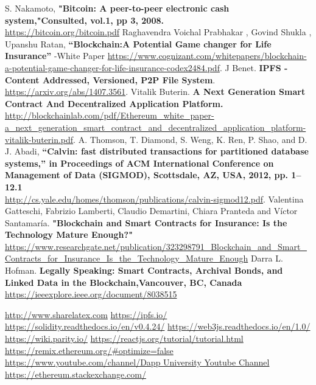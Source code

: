 \clearpage
{}
\renewcommand\bibname{Reference}
\begin{thebibliography}{99}
	\bibitem{}S. Nakamoto, \textbf{"Bitcoin: A peer-to-peer electronic cash system,"Consulted, vol.1, pp 3, 2008.}\\
	\url{https://bitcoin.org/bitcoin.pdf}
	\bibitem{}Raghavendra Voichal Prabhakar , Govind Shukla , Upanshu Ratan, \textbf{“Blockchain:A Potential Game changer for Life Insurance” }-White Paper
	\url{https://www.cognizant.com/whitepapers/blockchain-a-potential-game-changer-for-life-insurance-codex2484.pdf}.
	\bibitem{}J Benet. \textbf{IPFS - Content Addressed, Versioned, P2P File System}.\\
	\url{ https://arxiv.org/abs/1407.3561}.
	\bibitem{}Vitalik Buterin. \textbf{A Next Generation Smart Contract And Decentralized Application Platform.}\\
	\url{http://blockchainlab.com/pdf/Ethereum_white_paper-a_next_generation_smart_contract_and_decentralized_application_platform-vitalik-buterin.pdf}.
	\bibitem{}A. Thomson, T. Diamond, S. Weng, K. Ren, P. Shao, and D. J. Abadi, \textbf{“Calvin: fast distributed transactions for partitioned database systems,” in Proceedings of ACM International Conference on Management of Data (SIGMOD), Scottsdale, AZ, USA, 2012, pp. 1–12.1}\\
	\url{http://cs.yale.edu/homes/thomson/publications/calvin-sigmod12.pdf}.
	\bibitem{}Valentina Gatteschi, Fabrizio Lamberti, Claudio Demartini, Chiara Pranteda and Víctor Santamaría. \textbf{"Blockchain and Smart Contracts for Insurance: Is the Technology Mature Enough?"} \\
	\url{https://www.researchgate.net/publication/323298791_Blockchain_and_Smart_Contracts_for_Insurance_Is_the_Technology_Mature_Enough}
	\bibitem{}Darra L. Hofman. \textbf{Legally Speaking: Smart Contracts, Archival Bonds, and Linked Data in the Blockchain,Vancouver, BC, Canada}\\
	\url{https://ieeexplore.ieee.org/document/8038515}

	\item {}\url{http://www.sharelatex.com}
	\bibitem{} \url{https://ipfs.io/}
	\bibitem{} \url{https://solidity.readthedocs.io/en/v0.4.24/}
	\bibitem{} \url{https://web3js.readthedocs.io/en/1.0/}
	\bibitem{} \url{https://wiki.parity.io/}
	\bibitem{} \url{https://reactjs.org/tutorial/tutorial.html}
	\bibitem{} \url{https://remix.ethereum.org/#optimize=false}
	\bibitem{} \url{https://www.youtube.com/channel/Dapp University Youtube Channel}
	\bibitem{} \url{https://ethereum.stackexchange.com/}
\end{thebibliography}
